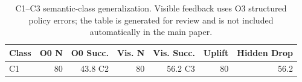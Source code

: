 \begin{table}[t]
\centering
\scriptsize
\caption{C1--C3 semantic-class generalization. Visible feedback uses O3 structured policy errors; the table is generated for review and is not included automatically in the main paper.}
\label{tab:c-semantic-generalization}
\begin{tabular}{lrrrrrr}
\toprule
Class & O0 N & O0 Succ. & Vis. N & Vis. Succ. & Uplift & Hidden Drop \\
\midrule
C1 & 80 & 43.8%
C2 & 80 & 56.2%
C3 & 80 & 56.2%
\bottomrule
\end{tabular}
\end{table}
